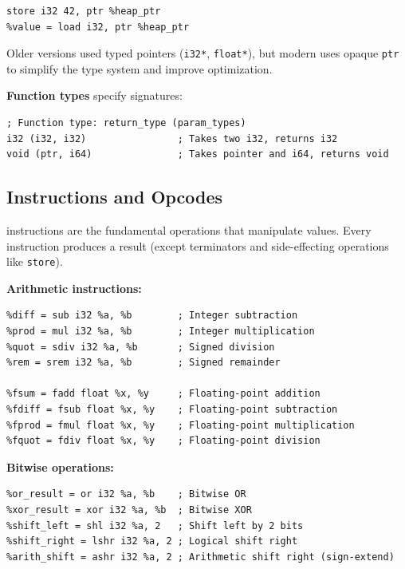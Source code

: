 \begin{lstlisting}[style=ir]
%heap_ptr = call ptr @malloc(i64 64)
store i32 42, ptr %heap_ptr
%value = load i32, ptr %heap_ptr
\end{lstlisting}

Older  versions used typed pointers (\texttt{i32*}, \texttt{float*}), but modern  uses opaque \texttt{ptr} to simplify the type system and improve optimization.

\textbf{Function types} specify signatures:

\begin{lstlisting}[style=ir]
; Function type: return_type (param_types)
i32 (i32, i32)                ; Takes two i32, returns i32
void (ptr, i64)               ; Takes pointer and i64, returns void
\end{lstlisting}

\subsection{Instructions and Opcodes}

 instructions are the fundamental operations that manipulate values. Every instruction produces a result (except terminators and side-effecting operations like \texttt{store}).

\textbf{Arithmetic instructions:}

\begin{lstlisting}[style=ir]
%sum = add i32 %a, %b         ; Integer addition
%diff = sub i32 %a, %b        ; Integer subtraction
%prod = mul i32 %a, %b        ; Integer multiplication
%quot = sdiv i32 %a, %b       ; Signed division
%rem = srem i32 %a, %b        ; Signed remainder

%fsum = fadd float %x, %y     ; Floating-point addition
%fdiff = fsub float %x, %y    ; Floating-point subtraction
%fprod = fmul float %x, %y    ; Floating-point multiplication
%fquot = fdiv float %x, %y    ; Floating-point division
\end{lstlisting}

\textbf{Bitwise operations:}

\begin{lstlisting}[style=ir]
%and_result = and i32 %a, %b  ; Bitwise AND
%or_result = or i32 %a, %b    ; Bitwise OR
%xor_result = xor i32 %a, %b  ; Bitwise XOR
%shift_left = shl i32 %a, 2   ; Shift left by 2 bits
%shift_right = lshr i32 %a, 2 ; Logical shift right
%arith_shift = ashr i32 %a, 2 ; Arithmetic shift right (sign-extend)
\end{lstlisting}

